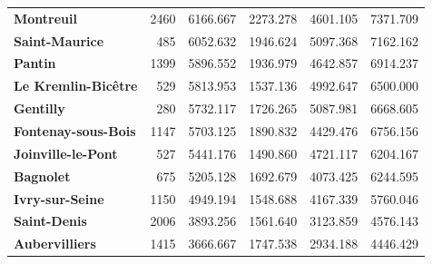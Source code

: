 \documentclass[12pt]{article}
\theoremstyle{plain}
\theoremstyle{remark}
\begin{document}
\begin{table}[!h]
\begin{tabular}{lrrrrr}
        \textbf{Montreuil} & 2460 & 6166.667 & 2273.278 & 4601.105 & 7371.709 \\
        \rowcolor{gray!10}\textbf{Saint-Maurice} & 485 & 6052.632 & 1946.624 & 5097.368 & 7162.162 \\
        \textbf{Pantin} & 1399 & 5896.552 & 1936.979 & 4642.857 & 6914.237 \\
        \rowcolor{gray!10}\textbf{Le Kremlin-Bicêtre} & 529 & 5813.953 & 1537.136 & 4992.647 & 6500.000 \\
        \midrule
        \textbf{Gentilly} & 280 & 5732.117 & 1726.265 & 5087.981 & 6668.605 \\
        \rowcolor{gray!10}\textbf{Fontenay-sous-Bois} & 1147 & 5703.125 & 1890.832 & 4429.476 & 6756.156 \\
        \textbf{Joinville-le-Pont} & 527 & 5441.176 & 1490.860 & 4721.117 & 6204.167 \\
        \rowcolor{gray!10}\textbf{Bagnolet} & 675 & 5205.128 & 1692.679 & 4073.425 & 6244.595 \\
        \textbf{Ivry-sur-Seine} & 1150 & 4949.194 & 1548.688 & 4167.339 & 5760.046 \\
        \rowcolor{gray!10}\textbf{Saint-Denis} & 2006 & 3893.256 & 1561.640 & 3123.859 & 4576.143 \\
        \textbf{Aubervilliers} & 1415 & 3666.667 & 1747.538 & 2934.188 & 4446.429 \\
        \bottomrule
    \end{tabular}
\end{table}
\label{tab:dist_minmax}
\break
\end{document}
